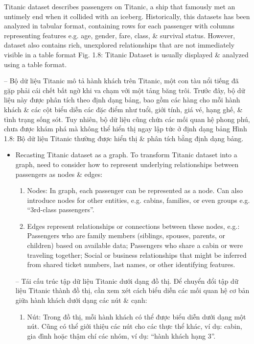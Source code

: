\documentclass{article}
\begin{document}
\begin{itemize}
\begin{itemize}
\begin{itemize}
            Titanic dataset describes passengers on Titanic, a ship that famously met an untimely end when it collided with an iceberg. Historically, this datasets has been analyzed in tabular format, containing rows for each passenger with columns representing features e.g. age, gender, fare, class, \& survival status. However, dataset also contains rich, unexplored relationships that are not immediately visible in a table format {\sf Fig. 1.8: Titanic Dataset is usually displayed \& analyzed using a table format.}

            -- Bộ dữ liệu Titanic mô tả hành khách trên Titanic, một con tàu nổi tiếng đã gặp phải cái chết bất ngờ khi va chạm với một tảng băng trôi. Trước đây, bộ dữ liệu này được phân tích theo định dạng bảng, bao gồm các hàng cho mỗi hành khách \& các cột biểu diễn các đặc điểm như tuổi, giới tính, giá vé, hạng ghế, \& tình trạng sống sót. Tuy nhiên, bộ dữ liệu cũng chứa các mối quan hệ phong phú, chưa được khám phá mà không thể hiển thị ngay lập tức ở định dạng bảng {\sf Hình 1.8: Bộ dữ liệu Titanic thường được hiển thị \& phân tích bằng định dạng bảng.}
            \begin{itemize}
                \item {\sf Recasting Titanic dataset as a graph.} To transform Titanic dataset into a graph, need to consider how to represent underlying relationships between passengers as nodes \& edges:
                \begin{enumerate}
                    \item Nodes: In graph, each passenger can be represented as a node. Can also introduce nodes for other entities, e.g. cabins, families, or even groups e.g. ``3rd-class passengers''.
                    \item Edges represent relationships or connections between these nodes, e.g.: Passengers who are family members (siblings, spouses, parents, or children) based on available data; Passengers who share a cabin or were traveling together; Social or business relationships that might be inferred from shared ticket numbers, last names, or other identifying features.
                \end{enumerate}
                -- {\sf Tái cấu trúc tập dữ liệu Titanic dưới dạng đồ thị.} Để chuyển đổi tập dữ liệu Titanic thành đồ thị, cần xem xét cách biểu diễn các mối quan hệ cơ bản giữa hành khách dưới dạng các nút \& cạnh:
                \begin{enumerate}
                    \item Nút: Trong đồ thị, mỗi hành khách có thể được biểu diễn dưới dạng một nút. Cũng có thể giới thiệu các nút cho các thực thể khác, ví dụ: cabin, gia đình hoặc thậm chí các nhóm, ví dụ: ``hành khách hạng 3''.

\end{enumerate}
\end{itemize}
\end{itemize}
\end{itemize}
\end{itemize}
\end{document}
